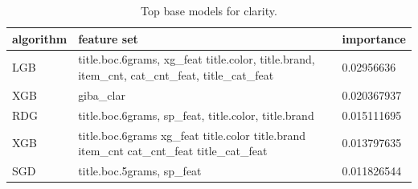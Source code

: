 \documentclass[sigconf]{acmart}
\begin{document}
\begin{table}[t]
\small
\centering
\caption{Top base models for clarity.}
\label{tbl:base_clarity}
\begin{tabular}{l p{3.5cm} l}
\hline
\textbf{algorithm} & \textbf{feature set} & \textbf{importance} \\ \hline

LGB & title.boc.6grams, xg\_feat title.color, title.brand, item\_cnt, cat\_cnt\_feat, title\_cat\_feat &	0.02956636 \\
XGB & giba\_clar &	0.020367937 \\
RDG & title.boc.6grams, sp\_feat, title.color, title.brand & 0.015111695 \\
XGB & title.boc.6grams xg\_feat title.color title.brand item\_cnt cat\_cnt\_feat title\_cat\_feat &	0.013797635 \\
SGD & title.boc.5grams, sp\_feat &	0.011826544 \\
\hline
\end{tabular}
\end{table}


 
\end{document}

